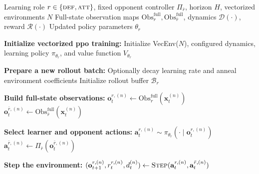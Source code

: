 \begin{algorithm}[H]
\caption{Single-Phase \acs{ppo} Update with Full-State Observations}
\label{alg:ppo_full_obs}
\begin{algorithmic}[1]
\Require Learning role $r\in\{\textsc{def},\textsc{att}\}$, fixed opponent controller $\Pi_{\bar r}$, horizon $H$, vectorized environments $N$
\Require Full-state observation maps $\mathrm{Obs}^{\mathrm{full}}_r,\mathrm{Obs}^{\mathrm{full}}_{\bar r}$, dynamics $\mathcal{D}(\cdot)$, reward $\mathcal{R}(\cdot)$
\Ensure Updated policy parameters $\theta_r$

\State \textbf{Initialize vectorized \acs{ppo} training:}
\State \hspace{1em} Initialize VecEnv($N$), configured dynamics, learning policy $\pi_{\theta_r}$, and value function $V_{\theta_r}$

  \State \textbf{Prepare a new rollout batch:}
  \State \hspace{1em} Optionally decay learning rate and anneal environment coefficients
  \State \hspace{1em} Initialize rollout buffer $\mathcal{B}_r$

    \State \textbf{Build full-state observations:}
    \State \hspace{1em} $\mathbf{o}_t^{r,(n)} \leftarrow \mathrm{Obs}^{\mathrm{full}}_r(\mathbf{x}_t^{(n)})$
    \State \hspace{1em} $\mathbf{o}_t^{\bar r,(n)} \leftarrow \mathrm{Obs}^{\mathrm{full}}_{\bar r}(\mathbf{x}_t^{(n)})$

    \State \textbf{Select learner and opponent actions:}
    \State \hspace{1em} $\mathbf{a}_t^{r,(n)} \sim \pi_{\theta_r}(\cdot \mid \mathbf{o}_t^{r,(n)})$
    \State \hspace{1em} $\mathbf{a}_t^{\bar r,(n)} \leftarrow \Pi_{\bar r}(\mathbf{o}_t^{\bar r,(n)})$

    \State \textbf{Step the environment:}
    \State \hspace{1em} $(\mathbf{o}_{t+1}^{r,(n)}, r_t^{r,(n)}, d_t^{(n)}) \leftarrow \textsc{Step}(\mathbf{a}_t^{r,(n)}, \mathbf{a}_t^{\bar r,(n)})$


\end{algorithmic}
\end{algorithm}
